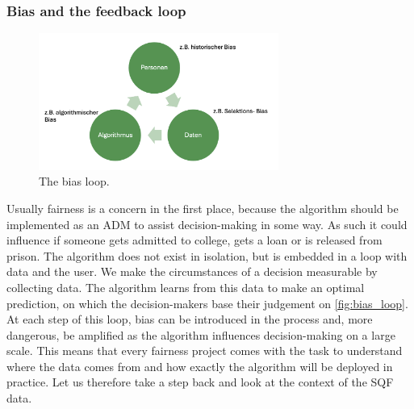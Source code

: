 \subsubsection*{Bias and the feedback loop}
\begin{figure}
    \centering
    \includegraphics[width=0.7\textwidth]{../figures/bias_loop.png}
    \caption{The bias loop.}
    \label{fig:bias_loop}
\end{figure}

Usually fairness is a concern in the first place, because the algorithm should be implemented as an ADM to assist decision-making in some way. As such it could influence if someone gets admitted to college, gets a loan or is released from prison. The algorithm does not exist in isolation, but is embedded in a loop with data and the user.
We make the circumstances of a decision measurable by collecting data. The algorithm learns from this data to make an optimal prediction, on which the decision-makers base their judgement on \autoref{fig:bias_loop}. At each step of this loop, bias can be introduced in the process and, more dangerous, be amplified as the algorithm influences decision-making on a large scale.
This means that every fairness project comes with the task to understand where the data comes from and how exactly the algorithm will be deployed in practice. Let us therefore take a step back and look at the context of the SQF data.



